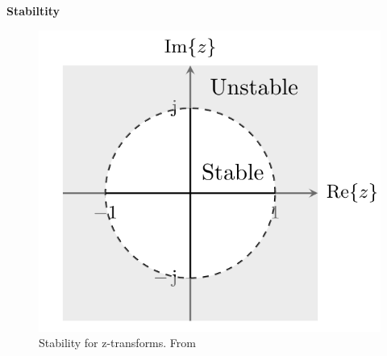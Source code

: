 \textbf{Stabiltity}
\begin{figure}[!ht]
   \centering
   \includegraphics[width=12cm]{image/stability_z-transform.png} 
   \caption{Stability for z-transforms. From \cite{}}
   \label{fig:stability_z-transform}
\end{figure}

